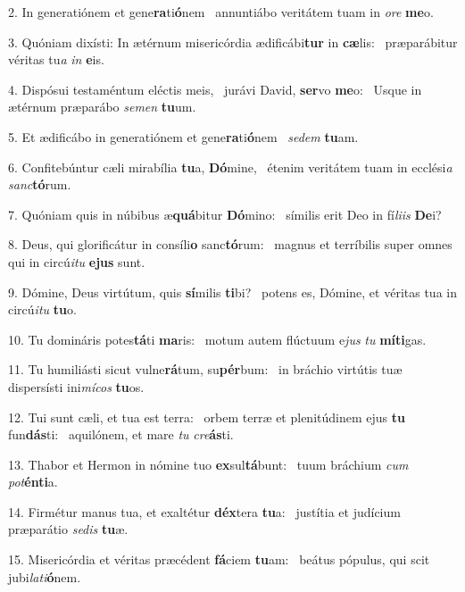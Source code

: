 2. In generatiónem et gene\textbf{ra}ti\textbf{ó}nem \ast\  annuntiábo veritátem tuam in \textit{o}\textit{re} \textbf{me}o.\

3. Quóniam dixísti: In ætérnum misericórdia ædificábi\textbf{tur} in \textbf{cæ}lis: \ast\  præparábitur véritas tu\textit{a} \textit{in} \textbf{e}is.\

4. Dispósui testaméntum eléctis meis, \dag\  jurávi David, \textbf{ser}vo \textbf{me}o: \ast\  Usque in ætérnum præparábo \textit{se}\textit{men} \textbf{tu}um.\

5. Et ædificábo in generatiónem et gene\textbf{ra}ti\textbf{ó}nem \ast\  \textit{se}\textit{dem} \textbf{tu}am.\

6. Confitebúntur cæli mirabília \textbf{tu}a, \textbf{Dó}mine, \ast\  étenim veritátem tuam in ecclési\textit{a} \textit{sanc}\textbf{tó}rum.\

7. Quóniam quis in núbibus æ\textbf{quá}bitur \textbf{Dó}mino: \ast\  símilis erit Deo in fí\textit{li}\textit{is} \textbf{De}i?\

8. Deus, qui glorificátur in consíli\textbf{o} sanc\textbf{tó}rum: \ast\  magnus et terríbilis super omnes qui in circú\textit{i}\textit{tu} \textbf{e}\textbf{jus} sunt.\

9. Dómine, Deus virtútum, quis \textbf{sí}milis \textbf{ti}bi? \ast\  potens es, Dómine, et véritas tua in circú\textit{i}\textit{tu} \textbf{tu}o.\

10. Tu domináris potes\textbf{tá}ti \textbf{ma}ris: \ast\  motum autem flúctuum e\textit{jus} \textit{tu} \textbf{mí}\textbf{ti}gas.\

11. Tu humiliásti sicut vulne\textbf{rá}tum, su\textbf{pér}bum: \ast\  in bráchio virtútis tuæ dispersísti ini\textit{mí}\textit{cos} \textbf{tu}os.\

12. Tui sunt cæli, et tua est terra: \dag\  orbem terræ et plenitúdinem ejus \textbf{tu} fun\textbf{dás}ti: \ast\  aquilónem, et mare \textit{tu} \textit{cre}\textbf{ás}ti.\

13. Thabor et Hermon in nómine tuo \textbf{ex}sul\textbf{tá}bunt: \ast\  tuum bráchium \textit{cum} \textit{pot}\textbf{én}\textbf{ti}a.\

14. Firmétur manus tua, et exaltétur \textbf{déx}tera \textbf{tu}a: \ast\  justítia et judícium præparátio \textit{se}\textit{dis} \textbf{tu}æ.\

15. Misericórdia et véritas præcédent \textbf{fá}ciem \textbf{tu}am: \ast\  beátus pópulus, qui scit jubi\textit{la}\textit{ti}\textbf{ó}nem.\

